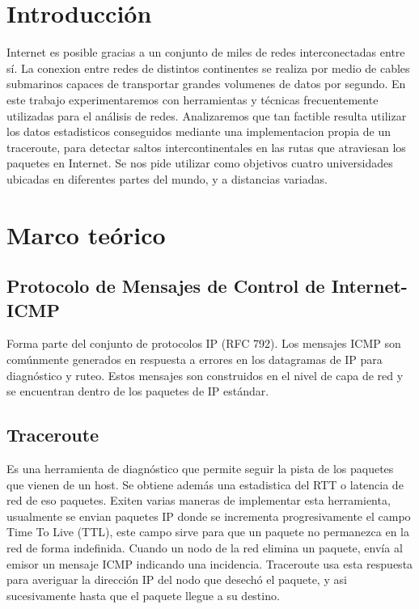 \section{Introducción}

Internet es posible gracias a un conjunto de miles de redes interconectadas entre sí.
La conexion entre redes de distintos continentes se realiza por medio de cables submarinos capaces de transportar grandes volumenes de datos por segundo.
En este trabajo experimentaremos con herramientas y técnicas frecuentemente utilizadas para el análisis de redes.
Analizaremos que tan factible resulta utilizar los datos estadisticos conseguidos mediante una implementacion propia de un traceroute, para detectar saltos intercontinentales en las rutas que atraviesan los paquetes en Internet.  
Se nos pide utilizar como objetivos cuatro universidades ubicadas en diferentes partes del mundo, y a distancias variadas.

\section{Marco teórico}

\subsection{Protocolo de Mensajes de Control de Internet- ICMP}

Forma parte del conjunto de protocolos IP (RFC 792). Los mensajes ICMP son comúnmente generados en respuesta a errores en los datagramas de IP para diagnóstico y ruteo. Estos mensajes son construidos en el nivel de capa de red y se encuentran dentro de los paquetes de IP estándar.

\subsection{Traceroute}

Es una herramienta de diagnóstico que permite seguir la pista de los paquetes que vienen de un host. Se obtiene además una estadistica del RTT o latencia de red de eso paquetes.
Exiten varias maneras de implementar esta herramienta, usualmente se envian paquetes IP donde se incrementa progresivamente el campo Time To Live (TTL), este campo sirve para que un paquete no permanezca en la red de forma indefinida. Cuando un nodo de la red elimina un paquete, envía al emisor un mensaje ICMP indicando una incidencia. Traceroute usa esta respuesta para averiguar la dirección IP del nodo que desechó el paquete, y asi sucesivamente hasta que el paquete llegue a su destino.


